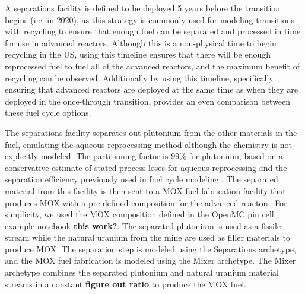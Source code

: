 

A separations facility is defined to be deployed 5 
years before the transition 
begins (i.e. in 2020), as this strategy is commonly used for modeling 
transitions with recycling \cite{passerini_systematic_2014,richards_application_2021}
to ensure that enough fuel can be separated and 
processed in time for use in advanced reactors. Although this is a 
non-physical time to begin recycling in the US, using this timeline ensures 
that there will be enough reprocessed fuel to fuel all of the advanced 
reactors, and the maximum benefit of recycling can be observed. Additionally 
by using this timeline, specifically ensuring that advanced reactors 
are deployed at the same time as when they are deployed in the once-through 
transition, provides an even comparison between these fuel cycle options.

The separations facility separates out plutonium from the other 
materials in the fuel, emulating the aqueous reprocessing method although the 
chemistry is not explicitly modeled. The partitioning factor is 99\% for
plutonium, based on a conservative estimate of stated 
process loses for aqueous reprocessing \cite{herbst_6_2011} and the 
separation efficiency previously used in fuel cycle modeling 
\cite{wigeland_nuclear_2014,sunny_transition_2015}. The separated 
material from this facility is then sent to a \gls{MOX} fuel fabrication 
facility that produces \gls{MOX} with a pre-defined composition for the 
advanced reactors. For simplicity, we used the \gls{MOX} composition 
defined in the OpenMC pin cell example notebook \textbf{this work?}.
The separated plutonium is used as a fissile stream while the 
natural uranium from the mine are used as filler materials to 
produce \gls{MOX}. The separation step is modeled using the \Cycamore 
Separations archetype, and the \gls{MOX} fuel fabrication is modeled 
using the \Cycamore Mixer archetype. The Mixer archetype combines the 
separated plutonium and natural uranium material streams in a constant 
\textbf{figure out ratio} to produce the \gls{MOX} fuel. 

